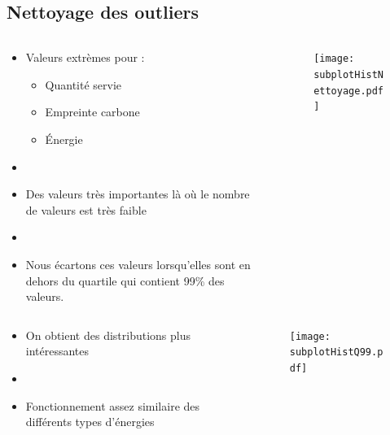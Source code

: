   \subsection{Nettoyage des outliers}
    \begin{frame}{\insertsubsection}
      \begin{columns}
        \begin{column}{.3\textwidth}
          \begin{itemize}
            \item Valeurs extrèmes pour :
            \begin{itemize}
              \item Quantité servie
              \item Empreinte carbone
              \item Énergie
            \end{itemize}
            \item[]
            \item Des valeurs très importantes là où le nombre de valeurs est très faible
            \item[]
            \item Nous écartons ces valeurs lorsqu'elles sont en dehors du quartile qui contient 99\% des valeurs. 
          \end{itemize}
        \end{column}
        \begin{column}{.7\textwidth}
          \begin{figure}
            \texttt{[image: subplotHistNettoyage.pdf]}
          \end{figure}  
        \end{column}        
      \end{columns}
    \end{frame}

    \begin{frame}{\insertsubsection}
      \begin{columns}
        \begin{column}{.3\textwidth}
          \begin{itemize}
            \item On obtient des distributions plus intéressantes
            \item[]
            \item Fonctionnement assez similaire des différents types d'énergies
          \end{itemize}
        \end{column}
        \begin{column}{.7\textwidth}
          \begin{figure}
            \texttt{[image: subplotHistQ99.pdf]}
          \end{figure}
        \end{column}
      \end{columns}
    \end{frame}

